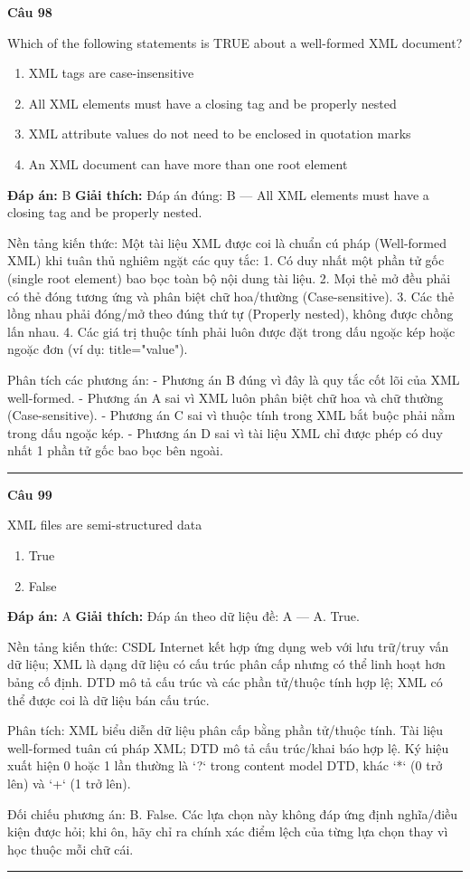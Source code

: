 \documentclass[11pt,a4paper]{article}
\newenvironment{question}[1]{%
  \par\vspace{1em}\noindent\textbf{\large Câu #1}\par\vspace{0.4em}
}{%
  \par\vspace{1em}\hrule\vspace{0.6em}
}
\newenvironment{choices}{%
  \begin{enumerate}[label=\textbf{\Alph*.},leftmargin=2.2em,itemsep=2pt,topsep=3pt]
}{%
  \end{enumerate}
}
\newcommand{\choice}{\item}
\begin{document}
\begin{question}{98}
Which of the following statements is TRUE about a well-formed XML document?
\begin{choices}
\choice XML tags are case-insensitive
\choice All XML elements must have a closing tag and be properly nested
\choice XML attribute values do not need to be enclosed in quotation marks
\choice An XML document can have more than one root element
\end{choices}
\textbf{Đáp án:} B
\textbf{Giải thích:} Đáp án đúng: B — All XML elements must have a closing tag and be properly nested.

Nền tảng kiến thức: Một tài liệu XML được coi là chuẩn cú pháp (Well-formed XML) khi tuân thủ nghiêm ngặt các quy tắc:
1. Có duy nhất một phần tử gốc (single root element) bao bọc toàn bộ nội dung tài liệu.
2. Mọi thẻ mở đều phải có thẻ đóng tương ứng và phân biệt chữ hoa/thường (Case-sensitive).
3. Các thẻ lồng nhau phải đóng/mở theo đúng thứ tự (Properly nested), không được chồng lấn nhau.
4. Các giá trị thuộc tính phải luôn được đặt trong dấu ngoặc kép hoặc ngoặc đơn (ví dụ: title="value").

Phân tích các phương án:
- Phương án B đúng vì đây là quy tắc cốt lõi của XML well-formed.
- Phương án A sai vì XML luôn phân biệt chữ hoa và chữ thường (Case-sensitive).
- Phương án C sai vì thuộc tính trong XML bắt buộc phải nằm trong dấu ngoặc kép.
- Phương án D sai vì tài liệu XML chỉ được phép có duy nhất 1 phần tử gốc bao bọc bên ngoài.
\end{question}

\begin{question}{99}
XML files are semi-structured data
\begin{choices}
\choice True
\choice False
\end{choices}
\textbf{Đáp án:} A
\textbf{Giải thích:} Đáp án theo dữ liệu đề: A — A. True.

Nền tảng kiến thức: CSDL Internet kết hợp ứng dụng web với lưu trữ/truy vấn dữ liệu; XML là dạng dữ liệu có cấu trúc phân cấp nhưng có thể linh hoạt hơn bảng cố định. DTD mô tả cấu trúc và các phần tử/thuộc tính hợp lệ; XML có thể được coi là dữ liệu bán cấu trúc.

Phân tích: XML biểu diễn dữ liệu phân cấp bằng phần tử/thuộc tính. Tài liệu well-formed tuân cú pháp XML; DTD mô tả cấu trúc/khai báo hợp lệ. Ký hiệu xuất hiện 0 hoặc 1 lần thường là `?` trong content model DTD, khác `*` (0 trở lên) và `+` (1 trở lên).

Đối chiếu phương án: B. False. Các lựa chọn này không đáp ứng định nghĩa/điều kiện được hỏi; khi ôn, hãy chỉ ra chính xác điểm lệch của từng lựa chọn thay vì học thuộc mỗi chữ cái.
\end{question}
\end{document}
